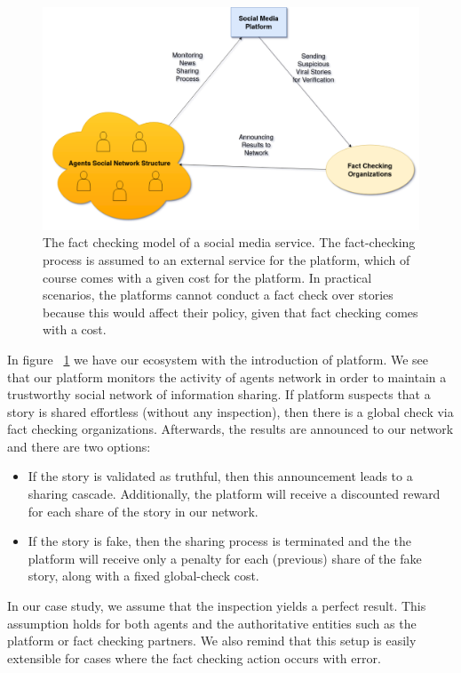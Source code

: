 \begin{figure}[t]
	\centering
	\includegraphics[width=.75\textwidth]{Figures/EntityDiagram.png}
	
	\caption{The fact checking model of a social media service. The fact-checking process is assumed to an external service for the platform, which of course comes with a given cost for the platform. In practical scenarios, the platforms cannot conduct a fact check over stories because this would affect their policy, given that fact checking comes with a cost.}
	
	\label{fig:entityDiagram}
\end{figure}

In figure ~\ref{fig:entityDiagram} we have our ecosystem with the introduction of platform. We see that our platform monitors the activity of agents network in order to maintain a trustworthy social network of information sharing. If platform suspects that a story is shared effortless (without any inspection), then there is a global check via fact checking organizations. Afterwards, the results are announced to our network and there are two options:

\begin{itemize}
	\item If the story is validated as truthful, then this announcement leads to a sharing cascade. Additionally, the platform will receive a discounted reward for each share of the story in our network.
	\item If the story is fake, then the sharing process is terminated and the the platform will receive only a penalty for each (previous) share of the fake story, along with a fixed global-check cost. 
\end{itemize}
In our case study, we assume that the inspection yields a perfect result. This assumption holds for both agents and the authoritative entities such as the platform or fact checking partners. We also remind that this setup is easily extensible for cases where the fact checking action occurs with error. 

